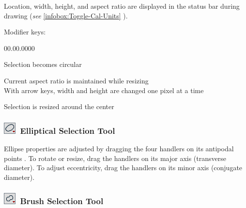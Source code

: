 \noindent Location, width, height, and aspect ratio are displayed
in the status bar during drawing (\emph{see} \ref{infobox:Toggle-Cal-Units}
).

Modifier keys:
\begin{lyxlist}{00.00.0000}
\item [{\mykeystroke{Shift}}] Selection becomes circular
\item [{\mykeystroke{Alt}}] \noindent Current aspect
ratio is maintained while resizing\\
With arrow keys, width and height are changed one pixel at a time
\item [{\mykeystroke{Ctrl}}] Selection is resized around the center
\end{lyxlist}



\subsubsection[Elliptical Selection Tool]{\noindent \textsf{\protect\includegraphics[bb=0bp 5bp 20bp 20bp,scale=0.6]{images/tools/Ellipse}}~Elliptical
Selection Tool\label{sub:Elliptical-Selection-Tool}\improvement{}}

Ellipse properties are adjusted by dragging the four handlers on its
antipodal points \cite{C-EllipseTool}. To rotate or resize, drag
the handlers on its major axis (transverse diameter). To adjust eccentricity,
drag the handlers on its minor axis (conjugate diameter). 




\subsubsection[Brush Selection Tool]{\noindent \textsf{\protect\includegraphics[bb=0bp 5bp 20bp 20bp,scale=0.6]{images/tools/Brush}}~Brush
Selection Tool\label{sub:Brush-Selection-Tool}\improvement{}}

